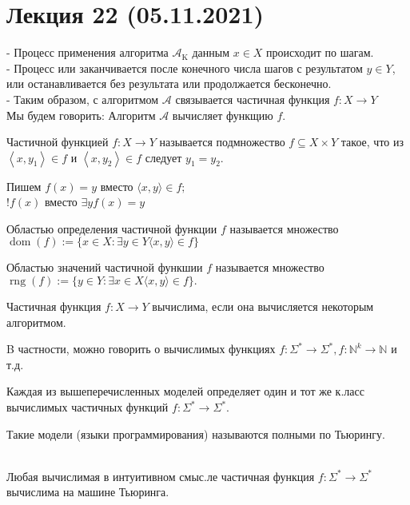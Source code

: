 \section{Лекция 22 (05.11.2021)}

- Процесс применения алгоритма $\mathcal{A}_{\mathrm{K}}$ данным $x \in X$ происходит по шагам.\\
- Процесс или заканчивается после конечного числа шагов с результатом $y \in Y$, или останавливается без результата или продолжается бесконечно.\\
- Таким образом, с алгоритмом $\mathcal{A}$ связывается частичная функция $f: X \rightarrow Y$\\
Мы будем говорить: Алгоритм $\mathcal{A}$ вычисляет функщию $f$.\\
\begin{defn}
Частичной функцией $f: X \rightarrow Y$ называется подмножество $f \subseteq X \times Y$ такое, что из $\left\langle x, y_{1}\right\rangle \in f$ и $\left\langle x, y_{2}\right\rangle \in f$ следует $y_{1}=y_{2}$.
\end{defn}
Пишем $f(x)=y$ вместо $\langle x, y\rangle \in f ;$\\
$! f(x)$ вместо $\exists y f(x)=y$
\begin{defn}
Областью определения частичной функции $f$ называется множество $\operatorname{dom}(f):=\{x \in X: \exists y \in Y\langle x, y\rangle \in f\}$
\end{defn}
\begin{defn}
Областью значений частичной функшии $f$ называется множество $\operatorname{rng}(f):=\{y \in Y: \exists x \in X\langle x, y\rangle \in f\} .$
\end{defn}
\begin{defn}
Частичная функция $f: X \rightarrow Y$ вычислима, если она вычисляется некоторым алгоритмом.
\end{defn}
B частности, можно говорить о вычислимых функциях $f: \Sigma^{*} \rightarrow \Sigma^{*}, f: \mathbb{N}^{k} \rightarrow \mathbb{N}$
и т.д.
\begin{theo}
Каждая из вышеперечисленных моделей определяет один и тот же к.ласс вычислимых частичных функций $f: \Sigma^{*} \rightarrow \Sigma^{*} .$
\end{theo}
Такие модели (языки программирования) называются полными по Тьюрингу.\\
\\
\begin{theo}
Любая вычислимая в интуитивном смыс.ле частичная функция $f: \Sigma^{*} \rightarrow \Sigma^{*}$ вычислима на машине Тьюринга.
\end{theo}
